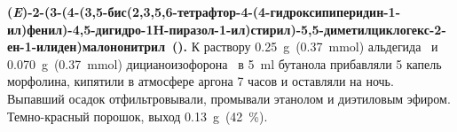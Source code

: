 \textbf{(\textit{E})-2-(3-(4-(3,5-бис(2,3,5,6-тетрафтор-4-(4-гидроксипиперидин-1-ил)фенил)-4,5-дигидро-1H-пиразол-1-ил)стирил)-5,5-диметилциклогекс-2-ен-1-илиден)малононитрил~().} К раствору \SI{0.25}{\gram}~(\SI{0.37}{\mmol}) альдегида~\textbf{} и \SI{0.070}{\gram}~(\SI{0.37}{\mmol}) дицианоизофорона~\textbf{} в \SI{5}{\milli\litre} бутанола прибавляли 5 капель морфолина, кипятили в атмосфере аргона 7 часов и оставляли на ночь. Выпавший осадок отфильтровывали, промывали этанолом и диэтиловым эфиром. Темно-красный порошок, выход \SI{0.13}{\gram}~(\SI{42}{\percent}).

